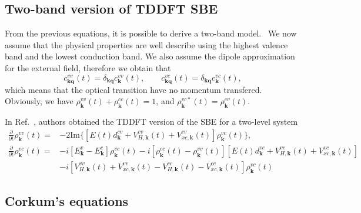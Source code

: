 \documentclass[a4paper,11pt]{report}
\renewcommand{\vec}[1]{\mathbf{#1}}
\begin{document}
\subsection{Two-band version of TDDFT SBE}

From the previous equations, it is possible to derive a two-band model.~\cite{PhysRevB.77.075204} We now assume that the physical properties are well describe using the  highest valence band and the lowest conduction band.
We also assume the dipole approximation for the external field, therefore we obtain that
\begin{equation}
 c^{vv}_\vec{kq}(t) = \delta_{\vec{kq}} c^{vv}_\vec{k}(t), \qquad c^{vc}_\vec{kq}(t) = \delta_{\vec{kq}} c^{vc}_\vec{k}(t),\nonumber
\end{equation}
which means that the optical transition have no momentum transfered.
Obviously, we have $\rho^{vv}_\vec{k}(t) + \rho^{cc}_\vec{k}(t) = 1$, and $\rho^{vc*}_\vec{k}(t)=\rho^{cv}_\vec{k}(t)$.

In Ref.~\cite{PhysRevB.77.075204}, authors obtained the TDDFT version of the SBE for a two-level system
\begin{subequations}
 \begin{align}
  \frac{\partial }{\partial t} \rho^{vv}_\vec{k}(t) =& -2\mathrm{Im}\{[E(t)d^{cv}_{\vec{k}} +  V_{H,\vec{k}}^{cv}(t) +  V_{xc,\vec{k}}^{cv}(t)]\rho^{vc}_\vec{k}(t) \},\\
  \frac{\partial }{\partial t} \rho^{vc}_\vec{k}(t) =& -i[E_\vec{k}^v-E_\vec{k}^c]\rho^{vc}_\vec{k}(t) - i[\rho^{cc}_\vec{k}(t)-\rho^{vv}_\vec{k}(t)][E(t)d^{vc}_{\vec{k}}+V_{H,\vec{k}}^{vc}(t) +  V_{xc,\vec{k}}^{vc}(t)] \nonumber \\
   &-i[V_{H,\vec{k}}^{vv}(t) +  V_{xc,\vec{k}}^{vv}(t) - V_{H,\vec{k}}^{cc}(t) -  V_{xc,\vec{k}}^{cc}(t)]\rho^{vc}_\vec{k}(t)
 \end{align}
 \label{eq:twolevel_TDDFT}
\end{subequations}


\subsection{Corkum's equations}
\end{document}
